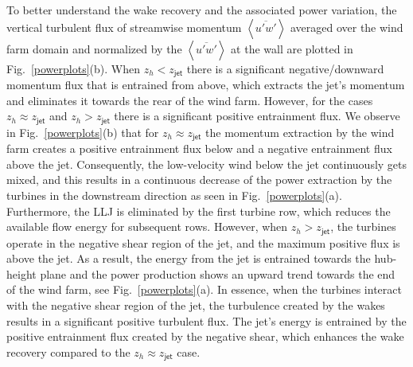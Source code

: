 \documentclass[%
 aip,
 amsmath,amssymb,
preprint,%
author-numerical,%
]{revtex4-1}
\begin{document}
To better understand the wake recovery and the associated power variation, the vertical turbulent flux of streamwise momentum $\left<\overline{u'w'}\right>$ averaged over the wind farm domain and normalized by the $\left<\overline{u'w'}\right>$ at the wall are plotted in Fig.\ \ref{powerplots}(b). When $z_h < z_\mathsf{jet}$ there is a significant negative/downward momentum flux that is entrained from above, which extracts the jet's momentum and eliminates it towards the rear of the wind farm. However, for the cases $z_h \approx z_\mathsf{jet}$ and $z_h > z_\mathsf{jet}$ there is a significant positive entrainment flux. We observe in Fig.\ \ref{powerplots}(b) that for $z_h \approx z_\mathsf{jet}$ the momentum extraction by the wind farm creates a positive entrainment flux below and a negative entrainment flux above the jet. Consequently, the low-velocity wind below the jet continuously gets mixed, and this results in a continuous decrease of the power extraction by the turbines in the downstream direction as seen in Fig.\ \ref{powerplots}(a). Furthermore, the LLJ is eliminated by the first turbine row, which reduces the available flow energy for subsequent rows. However, when $z_h > z_\mathsf{jet}$, the turbines operate in the negative shear region of the jet, and the maximum positive flux is above the jet. As a result, the energy from the jet is entrained towards the hub-height plane and the power production shows an upward trend towards the end of the wind farm, see Fig.\ \ref{powerplots}(a). In essence, when the turbines interact with the negative shear region of the jet, the turbulence created by the wakes results in a significant positive turbulent flux. The jet's energy is entrained by the positive entrainment flux created by the negative shear, which enhances the wake recovery compared to the $z_h \approx z_\mathsf{jet}$ case.
\end{document}
